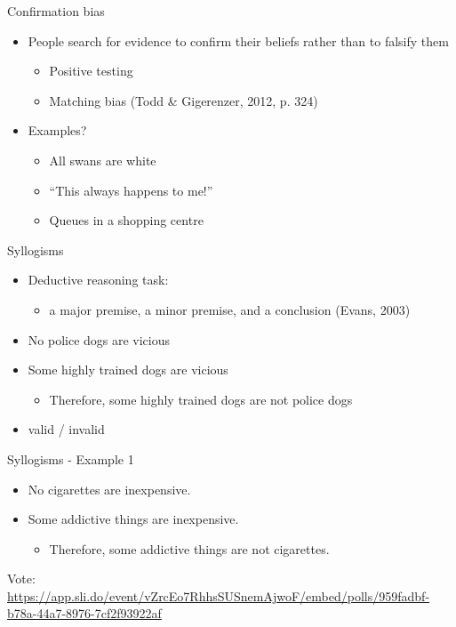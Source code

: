 \documentclass[
  ignorenonframetext,
]{beamer}
\providecommand{\tightlist}{%
  \setlength{\itemsep}{0pt}\setlength{\parskip}{0pt}}\usepackage{longtable,booktabs,array}
\begin{document}
\begin{frame}{Confirmation bias}
\protect\hypertarget{confirmation-bias}{}
\begin{itemize}
\tightlist
\item
  People search for evidence to confirm their beliefs rather than to
  falsify them

  \begin{itemize}
  \tightlist
  \item
    Positive testing
  \item
    Matching bias (Todd \& Gigerenzer, 2012, p. 324)
  \end{itemize}
\item
  Examples?

  \begin{itemize}
  \tightlist
  \item
    All swans are white
  \item
    ``This always happens to me!''
  \item
    Queues in a shopping centre
  \end{itemize}
\end{itemize}
\end{frame}

\begin{frame}{Syllogisms}
\protect\hypertarget{syllogisms}{}
\begin{itemize}
\tightlist
\item
  Deductive reasoning task:

  \begin{itemize}
  \tightlist
  \item
    a major premise, a minor premise, and a conclusion (Evans, 2003)
  \end{itemize}
\item
  No police dogs are vicious
\item
  Some highly trained dogs are vicious

  \begin{itemize}
  \tightlist
  \item
    Therefore, some highly trained dogs are not police dogs
  \end{itemize}
\item
  valid / invalid
\end{itemize}
\end{frame}

\begin{frame}{Syllogisms - Example 1}
\protect\hypertarget{syllogisms---example-1}{}
\begin{itemize}
\tightlist
\item
  No cigarettes are inexpensive.
\item
  Some addictive things are inexpensive.

  \begin{itemize}
  \tightlist
  \item
    Therefore, some addictive things are not cigarettes.
  \end{itemize}
\end{itemize}

Vote:
\url{https://app.sli.do/event/vZrcEo7RhhsSUSnemAjwoF/embed/polls/959fadbf-b78a-44a7-8976-7cf2f93922af}
\end{frame}
\end{document}
